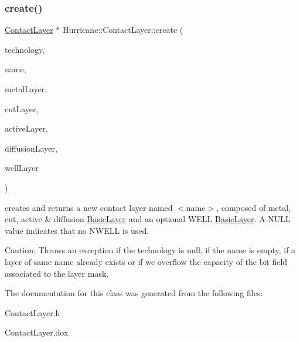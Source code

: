 \subsubsection{\texorpdfstring{create()}{create()}}
{\footnotesize\ttfamily \hyperlink{classHurricane_1_1ContactLayer}{Contact\+Layer} $\ast$ Hurricane\+::\+Contact\+Layer\+::create (\begin{DoxyParamCaption}\item[{\hyperlink{classHurricane_1_1Technology}{Technology} $\ast$}]{technology,  }\item[{const \hyperlink{classHurricane_1_1Name}{Name} \&}]{name,  }\item[{\hyperlink{classHurricane_1_1BasicLayer}{Basic\+Layer} $\ast$}]{metal\+Layer,  }\item[{\hyperlink{classHurricane_1_1BasicLayer}{Basic\+Layer} $\ast$}]{cut\+Layer,  }\item[{\hyperlink{classHurricane_1_1BasicLayer}{Basic\+Layer} $\ast$}]{active\+Layer,  }\item[{\hyperlink{classHurricane_1_1BasicLayer}{Basic\+Layer} $\ast$}]{diffusion\+Layer,  }\item[{\hyperlink{classHurricane_1_1BasicLayer}{Basic\+Layer} $\ast$}]{well\+Layer }\end{DoxyParamCaption})\hspace{0.3cm}{\ttfamily [static]}}

creates and returns a new contact layer named {\ttfamily $<$name$>$}, composed of metal, cut, active \& diffusion \hyperlink{classHurricane_1_1BasicLayer}{Basic\+Layer} and an optional W\+E\+LL \hyperlink{classHurricane_1_1BasicLayer}{Basic\+Layer}. A N\+U\+LL value indicates that no N\+W\+E\+LL is used.

\begin{DoxyParagraph}{Caution\+:}
Throws an exception if the technology is null, if the name is empty, if a layer of same name already exists or if we overflow the capacity of the bit field associated to the layer mask. 
\end{DoxyParagraph}


The documentation for this class was generated from the following files\+:\begin{DoxyCompactItemize}
\item 
Contact\+Layer.\+h\item 
Contact\+Layer.\+dox\end{DoxyCompactItemize}
